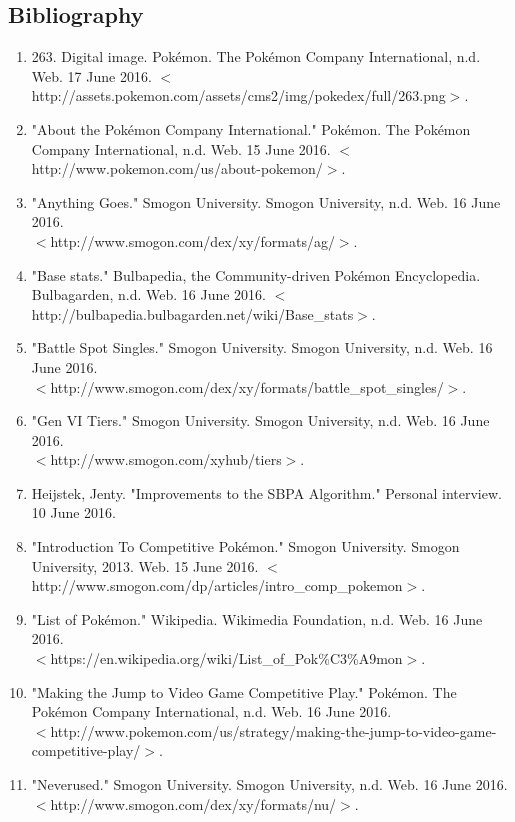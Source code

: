 \documentclass{article}
\begin{document}
\subsection{Bibliography}
\begin{enumerate}
	\item 263. Digital image. Pok\'emon. The Pok\'emon Company International, n.d. Web. 17 June 2016. $<$http://assets.pokemon.com/assets/cms2/img/pokedex/full/263.png$>$.  
	\item "About the Pokémon Company International." Pok\'emon. The Pok\'emon Company International, n.d. Web. 15 June 2016. $<$http://www.pokemon.com/us/about-pokemon/$>$.
	\item "Anything Goes." Smogon University. Smogon University, n.d. Web. 16 June 2016. \\$<$http://www.smogon.com/dex/xy/formats/ag/$>$. 
	\item "Base stats." Bulbapedia, the Community-driven Pokémon Encyclopedia. Bulbagarden, n.d. Web. 16 June 2016. $<$http://bulbapedia.bulbagarden.net/wiki/Base\_stats$>$.
	\item "Battle Spot Singles." Smogon University. Smogon University, n.d. Web. 16 June 2016. \\$<$http://www.smogon.com/dex/xy/formats/battle\_spot\_singles/$>$.
	\item "Gen VI Tiers." Smogon University. Smogon University, n.d. Web. 16 June 2016. \\$<$http://www.smogon.com/xyhub/tiers$>$. 
	\item  Heijstek, Jenty. "Improvements to the SBPA Algorithm." Personal interview. 10 June 2016.  
	\item"Introduction To Competitive Pok\'emon." Smogon University. Smogon University, 2013. Web. 15 June 2016. $<$http://www.smogon.com/dp/articles/intro\_comp\_pokemon$>$.
	\item "List of Pokémon." Wikipedia. Wikimedia Foundation, n.d. Web. 16 June 2016. \\$<$https://en.wikipedia.org/wiki/List\_of\_Pok\%C3\%A9mon$>$.
	\item "Making the Jump to Video Game Competitive Play." Pok\'emon. The Pok\'emon Company International, n.d. Web. 16 June 2016. \\$<$http://www.pokemon.com/us/strategy/making-the-jump-to-video-game-competitive-play/$>$.  
	\item "Neverused." Smogon University. Smogon University, n.d. Web. 16 June 2016. \\$<$http://www.smogon.com/dex/xy/formats/nu/$>$.

\end{enumerate}
\end{document}
